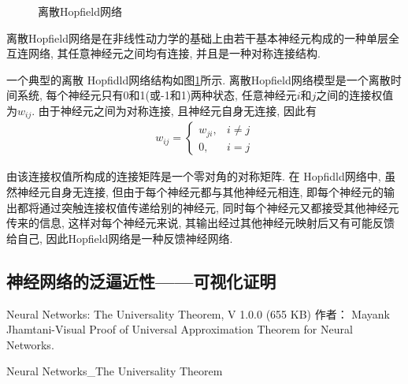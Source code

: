 \begin{figure}[H]
\begin{center}
\caption{离散Hopfield网络}
\label{AI32fig201912022608}
\end{center}
\end{figure}
离散Hopfield网络是在非线性动力学的基础上由若干基本神经元构成的一种单层全互连网络, 其任意神经元之间均有连接, 并且是一种对称连接结构.

\begin{example}
一个典型的离散 Hopfidld网络结构如图\ref{AI32fig201912022608}所示. 离散Hopfield网络模型是一个离散时间系统, 每个神经元只有0和1(或-1和1)两种状态, 任意神经元$i$和$j$之间的连接权值为$w_{ij}$. 由于神经元之间为对称连接, 且神经元自身无连接, 因此有
\begin{align}
  w_{i j}=\left\{
  \begin{array}{ll}
  {w_{j i}}, & i \neq j \\
    {0}, &  i=j
    \end{array}\right.
\end{align}
\end{example}
由该连接权值所构成的连接矩阵是一个零对角的对称矩阵. 在 Hopfidld网络中, 虽然神经元自身无连接, 但由于每个神经元都与其他神经元相连, 即每个神经元的输出都将通过突触连接权值传递给别的神经元, 同时每个神经元又都接受其他神经元传来的信息, 这样对每个神经元来说, 其输出经过其他神经元映射后又有可能反馈给自己, 因此Hopfield网络是一种反馈神经网络.

\subsection{神经网络的泛逼近性——可视化证明}
Neural Networks: The Universality Theorem, V 1.0.0 (655 KB) 作者： Mayank Jhamtani-Visual Proof of Universal Approximation Theorem for Neural Networks.

Neural Networks\_The Universality Theorem

